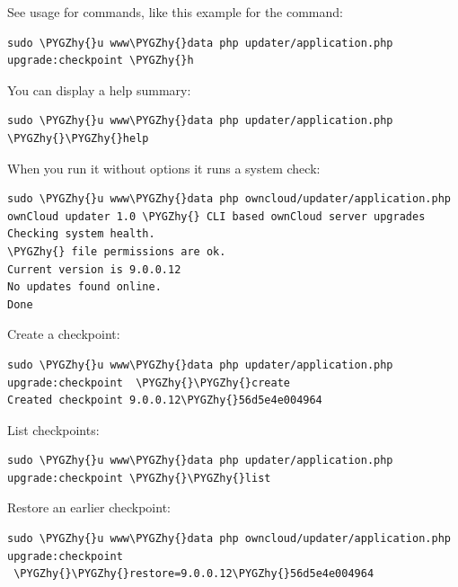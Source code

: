 \documentclass[letterpaper,10pt,english]{sphinxmanual}
\def\PYGZhy{\char`\-}
\begin{document}
See usage for commands, like this example for the 
command:

\begin{Verbatim}[commandchars=\\\{\}]
sudo \PYGZhy{}u www\PYGZhy{}data php updater/application.php upgrade:checkpoint \PYGZhy{}h
\end{Verbatim}

You can display a help summary:

\begin{Verbatim}[commandchars=\\\{\}]
sudo \PYGZhy{}u www\PYGZhy{}data php updater/application.php \PYGZhy{}\PYGZhy{}help
\end{Verbatim}

When you run it without options it runs a system check:

\begin{Verbatim}[commandchars=\\\{\}]
sudo \PYGZhy{}u www\PYGZhy{}data php owncloud/updater/application.php
ownCloud updater 1.0 \PYGZhy{} CLI based ownCloud server upgrades
Checking system health.
\PYGZhy{} file permissions are ok.
Current version is 9.0.0.12
No updates found online.
Done
\end{Verbatim}

Create a checkpoint:

\begin{Verbatim}[commandchars=\\\{\}]
sudo \PYGZhy{}u www\PYGZhy{}data php updater/application.php upgrade:checkpoint  \PYGZhy{}\PYGZhy{}create
Created checkpoint 9.0.0.12\PYGZhy{}56d5e4e004964
\end{Verbatim}

List checkpoints:

\begin{Verbatim}[commandchars=\\\{\}]
sudo \PYGZhy{}u www\PYGZhy{}data php updater/application.php upgrade:checkpoint \PYGZhy{}\PYGZhy{}list
\end{Verbatim}

Restore an earlier checkpoint:

\begin{Verbatim}[commandchars=\\\{\}]
sudo \PYGZhy{}u www\PYGZhy{}data php owncloud/updater/application.php upgrade:checkpoint
 \PYGZhy{}\PYGZhy{}restore=9.0.0.12\PYGZhy{}56d5e4e004964
\end{Verbatim}
\end{document}
